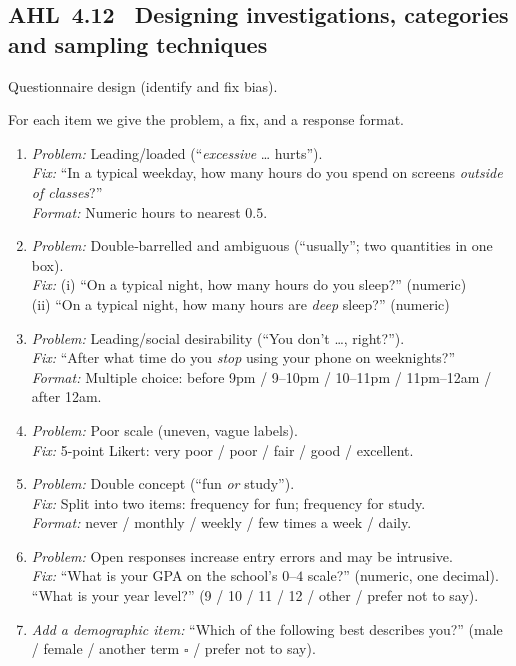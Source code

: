 \documentclass[11pt]{article}
\def\textbf#1{#1}%
\newcommand{\tocsubsection}[1]{\subsection{#1}}
\begin{document}

\tocsubsection{AHL 4.12 \; Designing investigations, categories and sampling techniques}


\begin{solution}
\textbf{Questionnaire design (identify and fix bias).}

For each item we give the problem, a fix, and a response format.

\begin{enumerate}
  \item \emph{Problem:} Leading/loaded (“\emph{excessive} … hurts”). \\
        \emph{Fix:} “In a typical weekday, how many hours do you spend on screens \emph{outside of classes}?” \\
        \emph{Format:} Numeric hours to nearest $0.5$.

  \item \emph{Problem:} Double‐barrelled and ambiguous (“usually”; two quantities in one box). \\
        \emph{Fix:} (i) “On a typical night, how many hours do you sleep?” (numeric) \\
        (ii) “On a typical night, how many hours are \emph{deep} sleep?” (numeric)

  \item \emph{Problem:} Leading/social desirability (“You don’t …, right?”). \\
        \emph{Fix:} “After what time do you \emph{stop} using your phone on weeknights?” \\
        \emph{Format:} Multiple choice: before 9pm / 9–10pm / 10–11pm / 11pm–12am / after 12am.

  \item \emph{Problem:} Poor scale (uneven, vague labels). \\
        \emph{Fix:} 5-point Likert: very poor / poor / fair / good / excellent.

  \item \emph{Problem:} Double concept (“fun \emph{or} study”). \\
        \emph{Fix:} Split into two items: frequency for fun; frequency for study. \\
        \emph{Format:} never / monthly / weekly / few times a week / daily.

  \item \emph{Problem:} Open responses increase entry errors and may be intrusive. \\
        \emph{Fix:} “What is your GPA on the school’s $0$–$4$ scale?” (numeric, one decimal).
        “What is your year level?” (9 / 10 / 11 / 12 / other / prefer not to say).

  \item \emph{Add a demographic item:} “Which of the following best describes you?” (male / female / another term $\square$ / prefer not to say).
\end{enumerate}
\end{solution}
\end{document}
